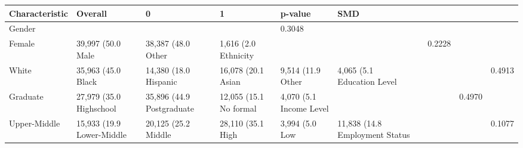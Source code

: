 \begin{table}[H]
\begin{center}
\begin{tabular}{llllll}
\toprule
Characteristic & Overall & 0 & 1 & p-value & SMD \\
\midrule
Gender &  &  &  & 0.3048 &  \\
   Female & 39,997 (50.0%
   Male & 38,387 (48.0%
   Other & 1,616 (2.0%
Ethnicity &  &  &  & 0.2228 &  \\
   White & 35,963 (45.0%
   Black & 14,380 (18.0%
   Hispanic & 16,078 (20.1%
   Asian & 9,514 (11.9%
   Other & 4,065 (5.1%
Education Level &  &  &  & 0.4913 &  \\
   Graduate & 27,979 (35.0%
   Highschool & 35,896 (44.9%
   Postgraduate & 12,055 (15.1%
   No formal & 4,070 (5.1%
Income Level &  &  &  & 0.4970 &  \\
   Upper-Middle & 15,933 (19.9%
   Lower-Middle & 20,125 (25.2%
   Middle & 28,110 (35.1%
   High & 3,994 (5.0%
   Low & 11,838 (14.8%
Employment Status &  &  &  & 0.1077 &  \\

\end{tabular}
\end{center}
\end{table}
